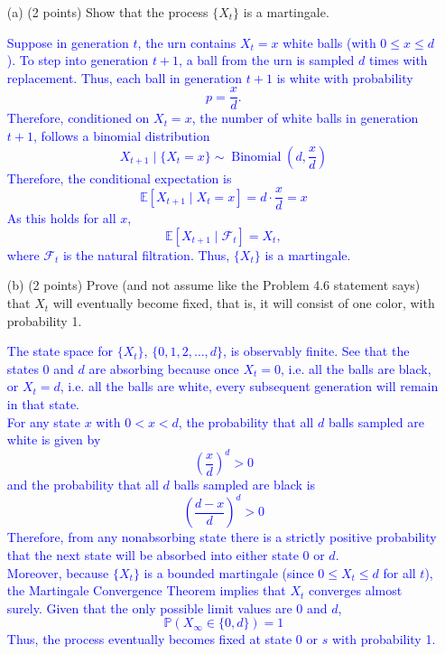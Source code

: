 \documentclass{article}
\begin{document}
\begin{enumerate}
    \item[(a)] (2 points) Show that the process $\{X_t\}$ is a martingale.

        \textcolor{blue}{Suppose in generation $t$, the urn contains $X_t =
            x$ white balls (with $0\le x\le d$). To step into generation $t+1$, a ball from the urn 
            is sampled $d$ times with replacement. Thus, each ball in
            generation $t+1$ is white with probability \[ p = \frac{x}{d}. \]
            Therefore, conditioned on $X_t=x$, the number of white balls
            in generation $t+1$, follows a binomial
            distribution \[ X_{t+1}\mid \{X_t=x\} \sim
                \operatorname{Binomial}\left(d, \frac{x}{d}\right) \] Therefore,
                the conditional expectation is \[ \mathbb{E}[X_{t+1}\mid X_t=x]
                    = d\cdot \frac{x}{d} = x \] As this holds for all $x$,
                    \[ \mathbb{E}[X_{t+1}\mid \mathcal{F}_t] = X_t, \]
                where $\mathcal{F}_t$ is the natural filtration. Thus,
            $\{X_t\}$ is a martingale. }


    \item[(b)] (2 points) Prove (and not assume like the Problem 4.6 statement says) that $X_t$ will eventually become fixed, that is, it will consist of one color, with probability 1.

    \textcolor{blue}{
        The state space for $\{X_t\}$, $\{0,1,2,\ldots,d\}$, is observably finite. See that the states $0$ and $d$ are absorbing because once $X_t=0$, i.e. all the balls are black, or $X_t=d$, i.e. all the balls are white, every subsequent generation will remain in that state. \\
For any state $x$ with $0 < x < d$, the probability that all $d$ balls sampled are white is given by
\[
\left(\frac{x}{d}\right)^d > 0
\]
and the probability that all $d$ balls sampled are black is
\[
\left(\frac{d-x}{d}\right)^d > 0
\]
Therefore, from any nonabsorbing state there is a strictly positive probability that the next state will be absorbed into either state $0$ or $d$. \\ 
Moreover, because $\{X_t\}$ is a bounded martingale (since $0\le X_t\le d$ for all $t$), the Martingale Convergence Theorem implies that $X_t$ converges almost surely. Given that the only possible limit values are $0$ and $d$,
\[
\mathbb{P}(X_\infty\in\{0,d\})=1
\]
Thus, the process eventually becomes fixed at state 0 or $s$ with probability 1.
}


\end{enumerate}
\end{document}
